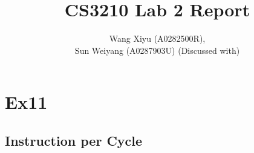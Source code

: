 \documentclass[a4paper]{article}
\begin{document}
\title{CS3210 Lab 2 Report}
\author{
  Wang Xiyu (A0282500R),\\ Sun Weiyang (A0287903U) (Discussed with)
}
\maketitle
\section*{Ex11}
\subsection*{Instruction per Cycle}
\par\vspace{3ex}
\begin{minipage}{0.5\linewidth}
    \noindent{}
\end{minipage}\hfill
\begin{minipage}{0.4\linewidth}
    
\end{minipage}\hfill
\end{document}
